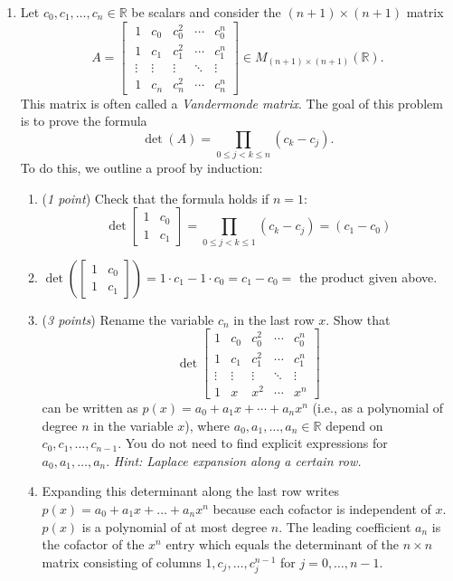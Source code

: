 \documentclass[11pt]{article}
\theoremstyle{definition}
\numberwithin{equation}{subsection}
\begin{document}
\begin{enumerate}
\item Let $c_0, c_1, \dots, c_n\in\mathbb{R}$ be scalars and consider the $(n+1)\times (n+1)$ matrix
$$A=\begin{bmatrix} \;1 & c_0 & c_0^2 & \cdots & c_0^{n}\\[4pt] \;1 & c_1 & c_1^2 & \cdots & c_1^{n}\\[4pt] \;\vdots & \vdots & \vdots & \ddots & \vdots\\[4pt] \;1 & c_n & c_n^2 & \cdots & c_n^{n}\end{bmatrix} \in M_{(n+1)\times (n+1)}(\mathbb{R}).$$
This matrix is often called a \emph{Vandermonde matrix}. The goal of this problem is to prove the formula
$$\det(A)=\prod_{0\leq j<k\leq n}(c_k-c_j).$$
To do this, we outline a proof by induction:

\begin{enumerate}

\item (\emph{1 point}) Check that the formula holds if $n=1$: 
$$\det\begin{bmatrix} 1 & c_0\\ 1 & c_1\end{bmatrix} =\prod_{0\leq j<k\leq 1}(c_k-c_j)=(c_1-c_0)$$
\item[] $\det(\begin{bmatrix}
    1&c_0\\1&c_1
\end{bmatrix})=1\cdot c_1-1\cdot c_0=c_1-c_0=$ the product given above.


\item (\emph{3 points}) Rename the variable $c_n$ in the last row $x$. Show that
$$\det\begin{bmatrix} 1 & c_0 & c_0^2 & \cdots & c_0^{n}\\[4pt] 1 & c_1 & c_1^2 & \cdots & c_1^{n}\\[4pt] \vdots & \vdots & \vdots & \ddots & \vdots\\[4pt] 1 & x & x^2 & \cdots & x^{n}\end{bmatrix}$$
can be written as $p(x)=a_0+a_1x+\cdots+a_nx^n$ (i.e., as a polynomial of degree $n$ in the variable $x$), where $a_0, a_1, \dots, a_n \in \mathbb{R}$ depend on $c_0, c_1, \dots, c_{n-1}$. You do not need to find explicit expressions for $a_0, a_1, \dots, a_n$. \emph{Hint: Laplace expansion along a certain row.}
\item[] Expanding this determinant along the last row writes $p(x)=a_0+a_1x+\ldots+a_nx^n$ because each cofactor is independent of $x$. $p(x)$ is a polynomial of at most degree $n$. The leading coefficient $a_n$ is the cofactor of the $x^n$ entry which equals the determinant of the $n\times n$ matrix consisting of columns $1,c_j,\ldots,c_j^{n-1}$ for $j=0,\ldots,n-1$.


\end{enumerate}
\end{enumerate}
\end{document}
